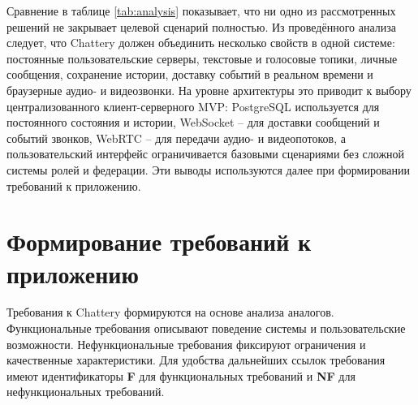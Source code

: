 \documentclass[a4paper,12pt]{extarticle}
\begin{document}
Сравнение в таблице \ref{tab:analysis} показывает, что ни одно из рассмотренных решений не закрывает целевой сценарий полностью. Из проведённого анализа следует, что Chattery должен объединить несколько свойств в одной системе: постоянные пользовательские серверы, текстовые и голосовые топики, личные сообщения, сохранение истории, доставку событий в реальном времени и браузерные аудио- и видеозвонки. На уровне архитектуры это приводит к выбору централизованного клиент-серверного MVP: PostgreSQL используется для постоянного состояния и истории, WebSocket -- для доставки сообщений и событий звонков, WebRTC -- для передачи аудио- и видеопотоков, а пользовательский интерфейс ограничивается базовыми сценариями без сложной системы ролей и федерации. Эти выводы используются далее при формировании требований к приложению.

\section{Формирование требований к приложению}
\label{sec:requirements}

Требования к Chattery формируются на основе анализа аналогов. Функциональные требования описывают поведение системы и пользовательские возможности. Нефункциональные требования фиксируют ограничения и качественные характеристики. Для удобства дальнейших ссылок требования имеют идентификаторы \textbf{F} для функциональных требований и \textbf{NF} для нефункциональных требований.
\end{document}
